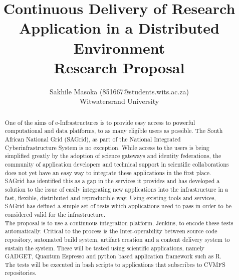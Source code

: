 \documentclass [titlepage,11pt]{article}
\title{\Huge Continuous Delivery of Research Application in a Distributed Environment \\\medskip Research Proposal}
\author{Sakhile Masoka (851667@students.wits.ac.za)\\Witwatersrand University}
\begin{document}
\maketitle



\begin{abstract}
One of the aims of e-Infrastructures is to provide easy access to powerful computational and data platforms, to as many eligible users as possible. The South African National Grid (SAGrid), as part of the National Integrated Cyberinfrastructure System is no exception. While access to the users is being simplified greatly by the adoption of science gateways and identity federations, the community of application developers and technical support in scientific collaborations does not yet have an easy way to integrate these applications in the first place.\\

SAGrid has identified this as a gap in the services it provides and has developed a solution to
the issue of easily integrating new applications into the infrastructure in a fast, flexible, distributed and reproducible way. Using existing tools and services, SAGrid has defined a simple set of tests which applications need to pass in order to be considered valid for the infrastructure.\\  

The proposal is to use a continuous integration platform, Jenkins, to encode these tests automatically. Critical to the process is the Inter-operability between source code repository, automated build system, artifact creation and a content delivery system to sustain the system. These will be tested using scientific applications, namely GADGET, Quantum Espresso and python based application framework such as R. The tests will be executed in bash scripts to applications that subscribes to CVMFS repositories.

\end{abstract}


\tableofcontents{}



\end{document}
